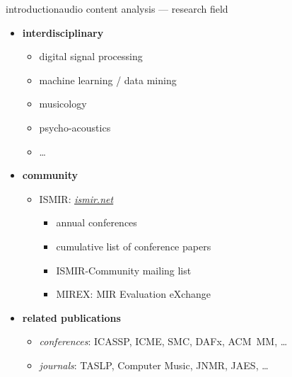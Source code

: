         \begin{frame}{introduction}{audio content analysis --- research field}
            \begin{itemize}
                \item<1->   \textbf{interdisciplinary}
                    \begin{itemize}
                        \item   digital signal processing
                        \item   machine learning / data mining
                        \item   musicology
                        \item   psycho-acoustics
                        \item   \ldots
                    \end{itemize}
                \bigskip
                \item<2->   \textbf{community}
                    \begin{itemize}
                        \item   ISMIR: \href{http://www.ismir.net}{\underline{\textit{ismir.net}}}
                            \begin{itemize}
                                \item   annual conferences
                                \item   cumulative list of conference papers
                                \item   ISMIR-Community mailing list
                                \item   MIREX: MIR Evaluation eXchange
                            \end{itemize}
                    \end{itemize}
                \bigskip
                \item<3->   \textbf{related publications} 
                    \begin{itemize}
                        \item   \textit{conferences}: ICASSP, ICME, SMC, DAFx, ACM~MM, \ldots
                        \item   \textit{journals}: TASLP, Computer Music, JNMR, JAES, \ldots
                    \end{itemize}
            \end{itemize}
            
        \end{frame}
